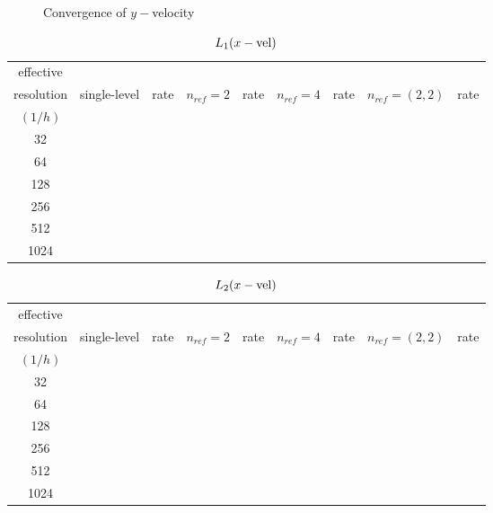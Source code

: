 \documentclass[12pt]{article}
\begin{document}
\begin{figure}
\centering
{}

\caption{Convergence of $y-$velocity}
\label{fig:yVelAMRConverge}
\end{figure}



\begin{table}
\centering
\begin{tabular}{|c|c|c|c|c|c|c|c|c|}
\hline
effective &  &  &  &  &  &  &  &  \\
resolution & single-level & rate & $n_{ref}=2$ & rate & $n_{ref} =
4$ & rate & $n_{ref}=(2,2)$ & rate \\
$(1/h)$ &  &  &  &  &  &  &  &  \\
\hline
32  &  &  &  &  &  &  &  &  \\
64  &  &  &  &  &  &  &  &  \\
128  &  &  &  &  &  &  &  &  \\
256  &  &  &  &  &  &  &  &  \\
512  &  &  &  &  &  &  &  &  \\
1024  &  &  &  &  &  &  &  &  \\
\hline
\end{tabular}
\caption{$L_1(x-{\rm vel})$}
\end{table}

\begin{table}
\centering
\begin{tabular}{|c|c|c|c|c|c|c|c|c|}
\hline
effective &  &  &  &  &  &  &  &  \\
resolution & single-level & rate & $n_{ref}=2$ & rate & $n_{ref} =
4$ & rate & $n_{ref}=(2,2)$ & rate \\
$(1/h)$ &  &  &  &  &  &  &  &  \\
\hline
32  &  &  &  &  &  &  &  &  \\
64  &  &  &  &  &  &  &  &  \\
128  &  &  &  &  &  &  &  &  \\
256  &  &  &  &  &  &  &  &  \\
512  &  &  &  &  &  &  &  &  \\
1024  &  &  &  &  &  &  &  &  \\
\hline
\end{tabular}
\caption{$L_2(x-{\rm vel})$}
\end{table}
\end{document}
